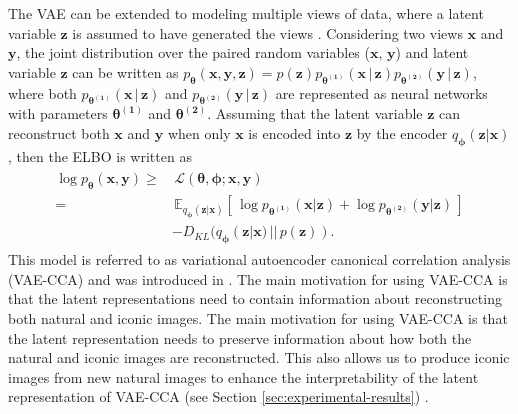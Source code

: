 The VAE can be extended to modeling multiple views of data, where a latent variable $\mathbf{z}$ is assumed to have generated the views \cite{vedantam2018generative,wang2016vcca}. Considering two views $\mathbf{x}$ and $\mathbf{y}$, the joint distribution over the paired random variables ($\mathbf{x}$, $\mathbf{y}$) and latent variable $\mathbf{z}$ can be written as $p_{\boldsymbol{\theta}}(\mathbf{x}, \mathbf{y}, \mathbf{z}) = p(\mathbf{z})p_{\boldsymbol{\theta^{(1)}}}(\mathbf{x}\,|\,\mathbf{z})p_{\boldsymbol{\theta^{(2)}}}(\mathbf{y}\,|\,\mathbf{z})$, where both $p_{\boldsymbol{\theta^{(1)}}}(\mathbf{x}\,|\,\mathbf{z})$ and $p_{\boldsymbol{\theta^{(2)}}}(\mathbf{y}\,|\,\mathbf{z})$ are represented as neural networks with parameters $\boldsymbol{\theta^{(1)}}$ and $\boldsymbol{\theta^{(2)}}$. Assuming that the latent variable $\mathbf{z}$ can reconstruct both $\mathbf{x}$ and $\mathbf{y}$ when only $\mathbf{x}$ is encoded into $\mathbf{z}$ by the encoder $q_{\boldsymbol{\phi}}(\mathbf{z}|\mathbf{x})$, then the ELBO is written as 
\begin{align}
\begin{split}\label{eq:vcca-loss}
\log p_{\boldsymbol{\theta}}(\mathbf{x}, \mathbf{y}) \geq & \, \mathcal{L}(\boldsymbol{\theta}, \boldsymbol{\phi}; \mathbf{x}, \mathbf{y}) \\ 
= & \,  \mathbb{E}_{q_{\boldsymbol{\phi}}(\mathbf{z}|\mathbf{x})}\left[\, \log p_{\boldsymbol{\theta^{(1)}}}(\mathbf{x} | \mathbf{z}) + \log p_{\boldsymbol{\theta^{(2)}}}(\mathbf{y} | \mathbf{z}) \,\right] \\ 
& -D_{KL}(q_{\boldsymbol{\phi}}(\mathbf{z}|\mathbf{x})\,||\,p(\mathbf{z})) .
\end{split}
\end{align}  
This model is referred to as variational autoencoder canonical correlation analysis (VAE-CCA) and was introduced in \cite{wang2016vcca}. The main motivation for using VAE-CCA is that the latent representations need to contain information about reconstructing both natural and iconic images.
The main motivation for using VAE-CCA is that 
the latent representation needs to preserve information about how both the natural and iconic images are reconstructed. This also allows us to produce iconic images from new natural images to enhance the interpretability of the latent representation of VAE-CCA (see Section \ref{sec:experimental-results}) \cite{vedantam2018generative}.

